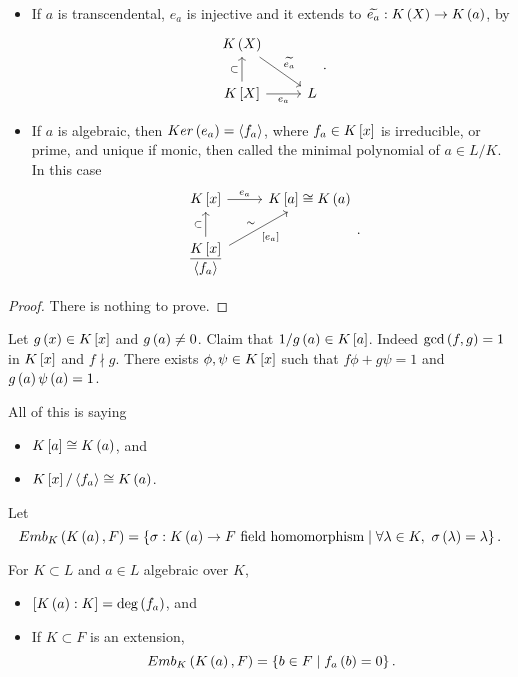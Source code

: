 \begin{lemma}
\hfill
\begin{itemize}
\item If $ a $ is transcendental, $ e_a $ is injective and it extends to $ \widetilde{e_a} : K\rb{X} \to K\rb{a} $, by
$$
\begin{tikzcd}
K\rb{X} \arrow{dr}{\widetilde{e_a}} & \\
K\sb{X} \arrow{u}{\subset} \arrow[swap]{r}{e_a} & L
\end{tikzcd}.
$$
\item If $ a $ is algebraic, then $ Ker\rb{e_a} = \ab{f_a} $, where $ f_a \in K\sb{x} $ is irreducible, or prime, and unique if monic, then called the minimal polynomial of $ a \in L / K $. In this case
$$
\begin{tikzcd}
K\sb{x} \arrow{r}{e_a} & K\sb{a} \cong K\rb{a} \\
\dfrac{K\sb{x}}{\ab{f_a}} \arrow{u}{\subset} \arrow{ur}{\sim}[swap]{\sb{e_a}}
\end{tikzcd}.
$$
\end{itemize}
\end{lemma}

\begin{proof}
There is nothing to prove.
\end{proof}

Let $ g\rb{x} \in K\sb{x} $ and $ g\rb{a} \ne 0 $. Claim that $ 1 / g\rb{a} \in K\sb{a} $. Indeed $ \gcd\rb{f, g} = 1 $ in $ K\sb{x} $ and $ f \nmid g $. There exists $ \phi, \psi \in K\sb{x} $ such that $ f\phi + g\psi = 1 $ and $ g\rb{a}\psi\rb{a} = 1 $.

\begin{remark}
All of this is saying
\begin{itemize}
\item $ K\sb{a} \cong K\rb{a} $, and
\item $ K\sb{x} / \ab{f_a} \cong K\rb{a} $.
\end{itemize}
\end{remark}

Let
$$ Emb_K\rb{K\rb{a}, F} = \cb{\sigma : K\rb{a} \to F \ \text{field homomorphism} \mid \forall \lambda \in K, \ \sigma\rb{\lambda} = \lambda}. $$

\begin{corollary}
For $ K \subset L $ and $ a \in L $ algebraic over $ K $,
\begin{itemize}
\item $ \sb{K\rb{a} : K} = \deg\rb{f_a} $, and
\item If $ K \subset F $ is an extension,
$$ Emb_K\rb{K\rb{a}, F} = \cb{b \in F \mid f_a\rb{b} = 0}. $$
\end{itemize}
\end{corollary}

